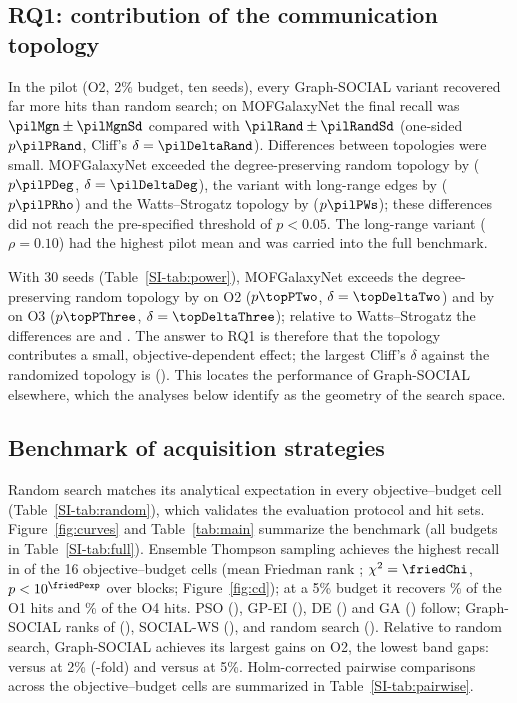 \documentclass[journal=jcisd8,manuscript=article]{achemso}
\newcommand{\gs}{Graph-SOCIAL}
\begin{document}
\subsection{RQ1: contribution of the communication topology}
In the pilot (O2, 2\% budget, ten seeds), every \gs{} variant recovered far more hits than random search; on MOFGalaxyNet the final recall was $\pilMgn\pm\pilMgnSd$ compared with $\pilRand\pm\pilRandSd$ (one-sided $p\pilPRand$, Cliff's $\delta=\pilDeltaRand$). Differences between topologies were small. MOFGalaxyNet exceeded the degree-preserving random topology by \pilDiffDeg{} ($p\pilPDeg$, $\delta=\pilDeltaDeg$), the variant with long-range edges by \pilDiffRho{} ($p\pilPRho$) and the Watts--Strogatz topology by \pilDiffWs{} ($p\pilPWs$); these differences did not reach the pre-specified threshold of $p<0.05$. The long-range variant ($\rho=0.10$) had the highest pilot mean and was carried into the full benchmark.

With 30 seeds (Table~\ref{SI-tab:power}), MOFGalaxyNet exceeds the degree-preserving random topology by \topDiffTwo{} on O2 ($p\topPTwo$, $\delta=\topDeltaTwo$) and by \topDiffThree{} on O3 ($p\topPThree$, $\delta=\topDeltaThree$); relative to Watts--Strogatz the differences are \topWsDiffTwo{} and \topWsDiffThree{}. The answer to RQ1 is therefore that the topology contributes a small, objective-dependent effect; the largest Cliff's $\delta$ against the randomized topology is \topDeltaMax{} (\topDeltaMaxWhich). This locates the performance of \gs{} elsewhere, which the analyses below identify as the geometry of the search space.

\subsection{Benchmark of acquisition strategies}
Random search matches its analytical expectation in every objective--budget cell (Table~\ref{SI-tab:random}), which validates the evaluation protocol and hit sets. Figure~\ref{fig:curves} and Table~\ref{tab:main} summarize the benchmark (all budgets in Table~\ref{SI-tab:full}). Ensemble Thompson sampling achieves the highest recall in \tsBestCells{} of the 16 objective--budget cells (mean Friedman rank \rankTs{}; $\chi^2=\friedChi$, $p<10^{\friedPexp}$ over \friedBlocks{} blocks; Figure~\ref{fig:cd}); at a 5\% budget it recovers \tsOoneFivePct\% of the O1 hits and \tsOfourFivePct\% of the O4 hits. PSO (\rankPso{}), GP-EI (\rankGp{}), DE (\rankDe{}) and GA (\rankGa{}) follow; \gs{} ranks \posGS{} of \nMethods{} (\rankGS{}), SOCIAL-WS \posWs{} (\rankWs{}), and random search \posRand{} (\rankRand{}). Relative to random search, \gs{} achieves its largest gains on O2, the lowest band gaps: \gsOtwoTwo{} versus \rndOtwoTwo{} at 2\% (\gainOtwoTwo-fold) and \gsOtwoFive{} versus \rndOtwoFive{} at 5\%. Holm-corrected pairwise comparisons across the \nCells{} objective--budget cells are summarized in Table~\ref{SI-tab:pairwise}.
\end{document}
